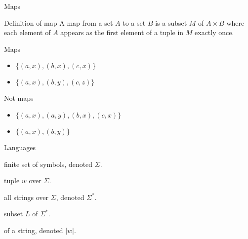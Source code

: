\begin{frame}{Maps}

  \begin{alertblock}{Definition of map}
    A map from a set $A$ to a set $B$ is a subset $M$ of $A \times B$ where each element of $A$ appears as the first element of a tuple in $M$ exactly once.
  \end{alertblock}


  \begin{minipage}[t]{0.48\linewidth}
  \begin{exampleblock}{Maps}
    \begin{itemize}
      \item $\{(a,x),(b,x),(c,x)\}$
      \item $\{(a,x),(b,y),(c,z)\}$
    \end{itemize}
  \end{exampleblock}
\end{minipage}
\begin{minipage}[t]{0.48\linewidth}
  \begin{exampleblock}{Not maps}
    \begin{itemize}
      \item $\{(a,x),(a,y),(b,x),(c,x)\}$
      \item $\{(a,x),(b,y)\}$
    \end{itemize}
  \end{exampleblock}
\end{minipage}
\end{frame}



\begin{frame}{Languages}
  \begin{description}
    \setlength\itemsep{6mm}
    \item[Alphabet:] finite set of symbols, denoted \( \Sigma \).
    \item[String:] tuple \( w \) over \( \Sigma \).
    \item[Star:] all strings over \( \Sigma \), denoted \( \Sigma^* \).
    \item[Language:] subset \( L \) of \( \Sigma^* \).
    \item[Length:] of a string, denoted \( |w| \).
  \end{description}
\end{frame}


